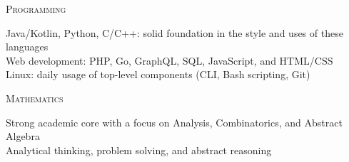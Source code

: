 \documentclass[letterpaper,10pt]{article}
\newenvironment{resumecols1}[1]
{
    \vspace{.1cm}
    \begin{minipage}[t]{.21\linewidth}
        \begin{flushright}
            \textsc{#1}
        \end{flushright}
    \end{minipage}
    \hspace{.005\linewidth}
    \begin{minipage}[t]{.77\linewidth}
}
{
    \end{minipage}
    \vspace{.1cm}
}
\begin{document}
\begin{resumecols1}{Programming}
    Java/Kotlin, Python, C/C++: solid foundation in the style and uses of these languages \\
    Web development: PHP, Go, GraphQL, SQL, JavaScript, and HTML/CSS \\
    Linux: daily usage of top-level components (CLI, Bash scripting, Git)
\end{resumecols1}

\begin{resumecols1}{Mathematics}
    Strong academic core with a focus on Analysis, Combinatorics, and Abstract Algebra \\
    Analytical thinking, problem solving, and abstract reasoning
\end{resumecols1}
\end{document}

